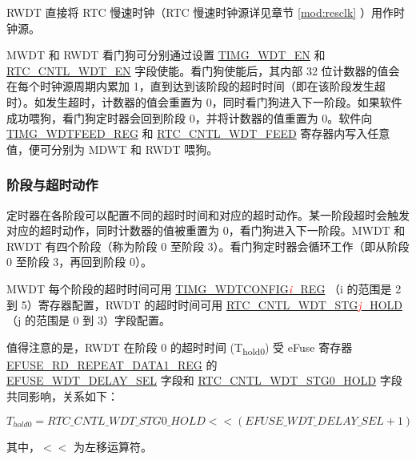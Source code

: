 \documentclass[main\_\_CN.tex]{subfiles}
\begin{document}
RWDT 直接将 RTC 慢速时钟（RTC 慢速时钟源详见章节 \ref{mod:resclk} \textit{}）用作时钟源。

MWDT 和 RWDT 看门狗可分别通过设置 \hyperref[fielddesc:TIMGWDTEN]{TIMG\_WDT\_EN} 和 \hyperref[fielddesc:RTCCNTLWDTEN]{RTC\_CNTL\_WDT\_EN} 字段使能。看门狗使能后，其内部 32 位计数器的值会在每个时钟源周期内累加 1，直到达到该阶段的超时时间（即在该阶段发生超时）。如发生超时，计数器的值会重置为 0，同时看门狗进入下一阶段。如果软件成功喂狗，看门狗定时器会回到阶段 0，并将计数器的值重置为 0。软件向 \hyperref[regdesc:TIMGWDTFEEDREG]{TIMG\_WDTFEED\_REG} 和 \hyperref[fielddesc:RTCCNTLWDTFEED]{RTC\_CNTL\_WDT\_FEED} 寄存器内写入任意值，便可分别为 MDWT 和 RWDT 喂狗。


\subsubsection{阶段与超时动作}\label{sec:wdt-timeout}
定时器在各阶段可以配置不同的超时时间和对应的超时动作。某一阶段超时会触发对应的超时动作，同时计数器的值被重置为 0，看门狗进入下一阶段。MWDT 和 RWDT 有四个阶段（称为阶段 0 至阶段 3）。看门狗定时器会循环工作（即从阶段 0 至阶段 3，再回到阶段 0）。

MWDT 每个阶段的超时时间可用 \hyperref[regdesc:TIMGWDTCONFIG2REG]{TIMG\_WDTCONFIG\textcolor{red}{\it{i}}\_REG} （i 的范围是 2 到 5）寄存器配置，RWDT 的超时时间可用 \hyperref[fielddesc:RTCCNTLWDTSTG3]{RTC\_CNTL\_WDT\_STG\textcolor{red}{\it{j}}\_HOLD}（j 的范围是 0 到 3）字段配置。

值得注意的是，RWDT 在阶段 0 的超时时间 (T\textsubscript{hold0}) 受 eFuse 寄存器 \hyperref[regdesc:EFUSERDREPEATDATA1REG]{EFUSE\_RD\_REPEAT\_DATA1\_REG} 的 \\\hyperref[fielddesc:EFUSEWDTDELAYSEL]{EFUSE\_WDT\_DELAY\_SEL} 字段和 \hyperref[fielddesc:RTCCNTLWDTSTG0HOLD]{RTC\_CNTL\_WDT\_STG0\_HOLD} 字段共同影响，关系如下：

\begin{displaymath}
T_{hold0} = \hyperref[fielddesc:RTCCNTLWDTSTG0HOLD]{RTC\_CNTL\_WDT\_STG0\_HOLD}   << (\hyperref[fielddesc:EFUSEWDTDELAYSEL]{EFUSE\_WDT\_DELAY\_SEL} + 1)
\end{displaymath}

其中，$<<$ 为左移运算符。
\end{document}

